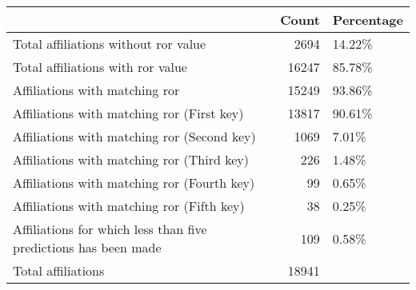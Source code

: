 \begin{tabular}{lrl}
\hline
                                                                 &   Count & Percentage   \\
\hline
 Total affiliations without ror value                            &    2694 & 14.22\%       \\
 Total affiliations with ror value                               &   16247 & 85.78\%       \\
 Affiliations with matching ror                                  &   15249 & 93.86\%       \\
 Affiliations with matching ror (First key)                      &   13817 & 90.61\%       \\
 Affiliations with matching ror (Second key)                     &    1069 & 7.01\%        \\
 Affiliations with matching ror (Third key)                      &     226 & 1.48\%        \\
 Affiliations with matching ror (Fourth key)                     &      99 & 0.65\%        \\
 Affiliations with matching ror (Fifth key)                      &      38 & 0.25\%        \\
 Affiliations for which less than five predictions has been made &     109 & 0.58\%        \\
 Total affiliations                                              &   18941 &              \\
\hline
\end{tabular}